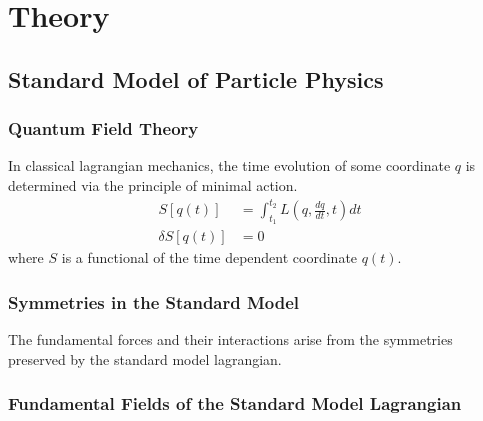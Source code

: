 \chapter{Theory}

\section{Standard Model of Particle Physics}

\subsection{Quantum Field Theory}

In classical lagrangian mechanics, the time evolution of some coordinate $q$ is determined via the principle of minimal action. 
\begin{align*}
S[q(t)] &= \int_{t_1}^{t_2} L(q,\frac{dq}{dt},t) dt\\
\delta S[q(t)] &= 0 
\end{align*}
where $S$ is a functional of the time dependent coordinate $q(t)$. 

\subsection{Symmetries in the Standard Model}

The fundamental forces and their interactions arise from the symmetries preserved by the standard model lagrangian. 

\subsection{Fundamental Fields of the Standard Model Lagrangian}



